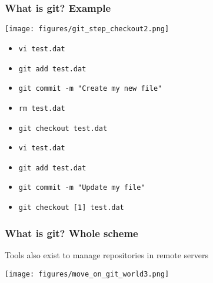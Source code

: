 \documentclass[xcolor=dvipsnames,10pt]{beamer}
\begin{document}
\addtocounter{framenumber}{-1}
\begin{frame}
 \frametitle{What is git? Example}
 
 \begin{center}
  \texttt{[image: figures/git\_step\_checkout2.png]}
 \end{center}
 \vspace*{-0.5cm}
 
 \begin{itemize}
  \color{gray}
  \item[] \texttt{vi test.dat}
  \item[] \texttt{git add test.dat}
  \item[] \texttt{git commit -m "Create my new file"}
  \item[] \texttt{rm test.dat}
  \item[] \texttt{git checkout test.dat}
  \item[] \texttt{vi test.dat}
  \item[] \texttt{git add test.dat}
  \item[] \texttt{git commit -m "Update my file"}
  \color{black}
  \item   \texttt{git checkout [1] test.dat}
  \color{white}
 \end{itemize}

\end{frame}


\begin{frame}
 \frametitle{What is git? Whole scheme}
 
 Tools also exist to manage repositories in remote servers
  \vspace*{0.4cm}
 
 \begin{center}
 \texttt{[image: figures/move\_on\_git\_world3.png]}
 \end{center}
 
\end{frame}
\end{document}

